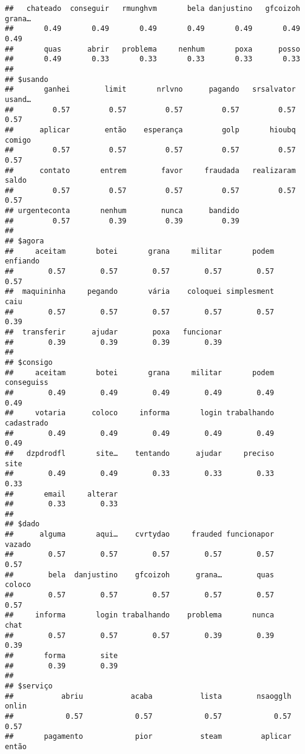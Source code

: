 \documentclass[
]{article}
\begin{document}
\begin{verbatim}
##   chateado  conseguir   rmunghvm       bela danjustino   gfcoizoh     grana… 
##       0.49       0.49       0.49       0.49       0.49       0.49       0.49 
##       quas      abrir   problema     nenhum       poxa      posso 
##       0.49       0.33       0.33       0.33       0.33       0.33 
## 
## $usando
##       ganhei        limit       nrlvno      pagando   srsalvator       usand… 
##         0.57         0.57         0.57         0.57         0.57         0.57 
##      aplicar        então    esperança         golp       hioubq       comigo 
##         0.57         0.57         0.57         0.57         0.57         0.57 
##      contato       entrem        favor     fraudada   realizaram        saldo 
##         0.57         0.57         0.57         0.57         0.57         0.57 
## urgenteconta       nenhum        nunca      bandido 
##         0.57         0.39         0.39         0.39 
## 
## $agora
##     aceitam       botei       grana     militar       podem    enfiando 
##        0.57        0.57        0.57        0.57        0.57        0.57 
##  maquininha     pegando       vária    coloquei simplesment        caiu 
##        0.57        0.57        0.57        0.57        0.57        0.39 
##  transferir      ajudar        poxa   funcionar 
##        0.39        0.39        0.39        0.39 
## 
## $consigo
##     aceitam       botei       grana     militar       podem  conseguiss 
##        0.49        0.49        0.49        0.49        0.49        0.49 
##     votaria      coloco     informa       login trabalhando  cadastrado 
##        0.49        0.49        0.49        0.49        0.49        0.49 
##   dzpdrodfl       site…    tentando      ajudar     preciso        site 
##        0.49        0.49        0.33        0.33        0.33        0.33 
##       email     alterar 
##        0.33        0.33 
## 
## $dado
##      alguma       aqui…    cvrtydao     frauded funcionapor      vazado 
##        0.57        0.57        0.57        0.57        0.57        0.57 
##        bela  danjustino    gfcoizoh      grana…        quas      coloco 
##        0.57        0.57        0.57        0.57        0.57        0.57 
##     informa       login trabalhando    problema       nunca        chat 
##        0.57        0.57        0.57        0.39        0.39        0.39 
##       forma        site 
##        0.39        0.39 
## 
## $serviço
##           abriu           acaba           lista        nsaogglh           onlin 
##            0.57            0.57            0.57            0.57            0.57 
##       pagamento            pior           steam         aplicar           então 

\end{verbatim}
\end{document}
